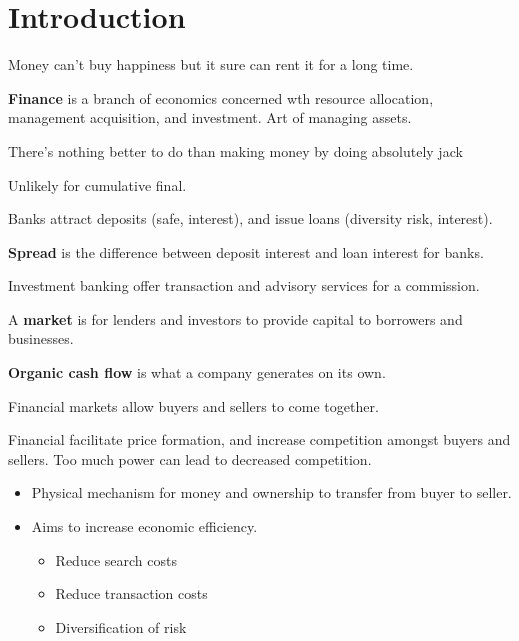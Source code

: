 \documentclass[english, 12pt]{article}
\begin{document}
\notesheader
\section{Introduction}
Money  can't buy happiness but it sure can rent it for a long time.



\begin{defn}
\textbf{Finance} is a branch of economics concerned wth resource allocation, management acquisition, and investment. Art of managing assets.
\end{defn}
\begin{qte}
There's nothing better to do than making money by doing absolutely jack
\end{qte}
Unlikely for cumulative final.

Banks attract deposits (safe, interest), and issue loans (diversity risk, interest).
\begin{defn}
\textbf{Spread} is the difference between deposit interest and loan interest for banks.
\end{defn}


Investment banking offer transaction and advisory services for a commission.

\begin{defn}
A \textbf{market} is for lenders and investors to provide capital to borrowers and businesses.
\end{defn}
\begin{defn}
\textbf{Organic cash flow} is what a company generates on its own.
\end{defn}

\begin{qte}
Financial markets allow buyers and sellers to come together.
\end{qte}
\begin{note}
Financial facilitate price formation, and increase competition amongst buyers and sellers. Too much power can lead to decreased competition.

\begin{itemize}
\item Physical mechanism for money and ownership to transfer from buyer to seller.
\item Aims to increase economic efficiency.
\begin{itemize}
\item Reduce search costs
\item Reduce transaction costs
\item Diversification of risk
\end{itemize}
\end{itemize}
\end{note}
\end{document}
